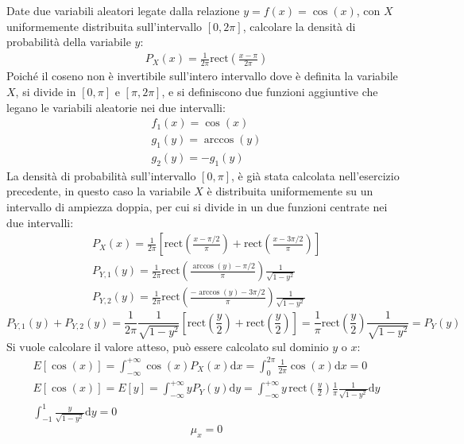 \documentclass{article}
\newcommand{\rect}{\mathrm{rect}}
\newcommand{\df}{\mathrm{d}}
\begin{document}
Date due variabili aleatori legate dalla relazione $y=f(x)=\cos(x)$, con $X$ uniformemente distribuita sull'intervallo $[0,2\pi]$, calcolare la densità di probabilità 
della variabile $y$:
\begin{gather*}
    P_X(x)=\displaystyle\frac{1}{2\pi}\rect\left(\frac{x-\pi}{2\pi}\right)
\end{gather*}
Poiché il coseno non è invertibile sull'intero intervallo dove è definita la variabile $X$, si divide in $[0,\pi]$ e $[\pi,2\pi]$, e si definiscono due funzioni 
aggiuntive che legano le variabili aleatorie nei due intervalli:
\begin{gather*}
    f_1(x)=\cos(x)\\
    g_1(y)=\arccos(y)\\
    g_2(y)=-g_1(y)
\end{gather*}
La densità di probabilità sull'intervallo $[0,\pi]$, è già stata calcolata nell'esercizio precedente, in questo caso la variabile $X$ è distribuita uniformemente su un 
intervallo di ampiezza doppia, per cui si divide in un due funzioni centrate nei due intervalli:
\begin{gather*}
    P_X(x)=\displaystyle\frac{1}{2\pi}\left[\rect\left(\frac{x-\pi/2}{\pi}\right)+\rect\left(\frac{x-3\pi/2}{\pi}\right)\right]\\
    P_{Y,1}(y)=\displaystyle\frac{1}{2\pi}\rect\left(\frac{\arccos(y)-\pi/2}{\pi}\right)\frac{1}{\sqrt{1-y^2}}\\
    P_{Y,2}(y)=\displaystyle\frac{1}{2\pi}\rect\left(\frac{-\arccos(y)-3\pi/2}{\pi}\right)\frac{1}{\sqrt{1-y^2}}
\end{gather*}
\begin{equation}
    P_{Y,1}(y)+P_{Y,2}(y)=\displaystyle\frac{1}{2\pi}\frac{1}{\sqrt{1-y^2}}\left[\rect\left(\frac{y}{2}\right)+\rect\left(\frac{y}{2}\right)\right]=\frac{1}{\pi}\rect\left(\displaystyle\frac{y}{2}\right)\frac{1}{\sqrt{1-y^2}}=P_Y(y)
\end{equation}
Si vuole calcolare il valore atteso, può essere calcolato sul dominio $y$ o $x$:
\begin{gather*}
    E[\cos (x)]=\displaystyle\int_{-\infty}^{+\infty}\cos (x)P_X(x)\df x =\int_0^{2\pi}\frac{1}{2\pi}\cos(x)\df x=0\\
    E[\cos(x)]=E[y]=\displaystyle\int_{-\infty}^{+\infty}yP_Y(y)\df y=\int_{-\infty}^{+\infty}y\,\rect\left(\frac{y}{2}\right)\frac{1}{\pi}\frac{1}{\sqrt{1-y^2}}\df y\\
    \displaystyle\int_{-1}^1\frac{y}{\sqrt{1-y^2}}\df y=0
\end{gather*}
\begin{equation}
    \mu_x=0
\end{equation}
\end{document}
